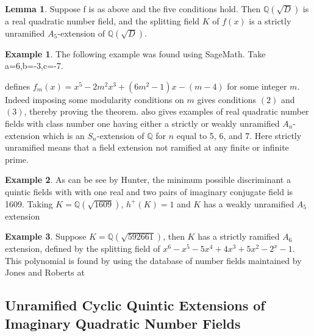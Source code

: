 \documentclass[12pt]{extarticle}
\newcommand{\Q}{\mathbb{Q}}
\newcommand{\<}{\langle}
\renewcommand{\>}{\rangle}
\theoremstyle{definition}
\newtheorem*{example}{Example}
\newtheorem{lemma}{Lemma}
\begin{document}
\begin{lemma}
Suppose f is as above and the five conditions hold. Then $\Q(\sqrt{D})$ is a real quadratic number field, and the splitting field $K$ of $f(x) $ is a strictly unramified $A_5$-extension of $\Q(\sqrt{D})$. 
\end{lemma}
\begin{example}
    The following example was found using SageMath. Take a=6,b=-3,c=-7. 
\end{example}
\cite{YAMAMURA2} defines $f_m(x)= x^5-2m^2x^3+(6m^2-1)x-(m-4)$ for some integer $m$. Indeed imposing some modularity conditions on $m$ gives conditions $(2)$ and $(3)$, thereby proving the theorem. 
\cite{YAMAMURA2} also gives examples of real quadratic number fields with class number one having either a strictly or weakly unramified $A_n$-extension which is an $S_n$-extension of $\Q$ for $n$ equal to 5, 6, and 7. Here strictly unramified means that a field extension not ramified at any finite or infinite prime.
\begin{example}
As can be see by Hunter, the minimum possible discriminant a quintic fields with with one real and two pairs of imaginary conjugate field is 1609. 
Taking $K=\Q(\sqrt{1609})$, $h^{+}(K)=1$ and $K$ has a weakly unramified $A_5$ extension
\end{example}
\begin{example}
Suppose $K=\Q(\sqrt{592661})$, then $K$ has a strictly ramified $A_6$ extension, defined by the splitting field of  $x^6 - x^5 - 5x^4 + 4x^3 + 5x^2 - 2^x - 1$. This polynomial is found by using the database of number fields maintained by Jones and Roberts at \cite{JONE2}
\end{example}
\subsection{Unramified Cyclic Quintic Extensions of Imaginary Quadratic Number Fields}
\end{document}
